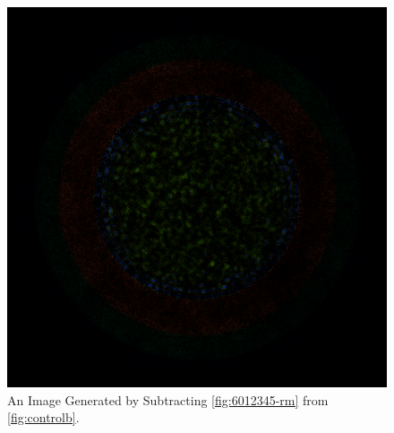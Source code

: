 \begin{figure}[H]
\centering
\includegraphics[width=0.6\linewidth]{figures/shuffle/diff-6012345}
\caption{An Image Generated by Subtracting \ref{fig:6012345-rm} from \ref{fig:controlb}.}
\label{fig:diff-6012345}
\end{figure}